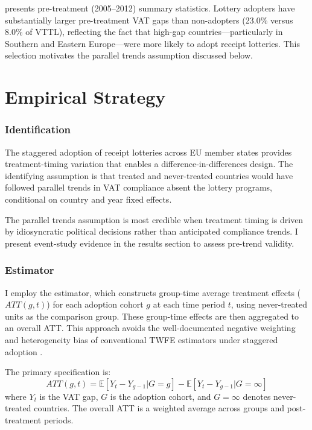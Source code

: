 \documentclass[12pt]{article}
\newcommand{\E}{\mathbb{E}}
\begin{document}


 presents pre-treatment (2005--2012) summary statistics. Lottery adopters have substantially larger pre-treatment VAT gaps than non-adopters (23.0\% versus 8.0\% of VTTL), reflecting the fact that high-gap countries---particularly in Southern and Eastern Europe---were more likely to adopt receipt lotteries. This selection motivates the parallel trends assumption discussed below.

\section{Empirical Strategy}
\label{sec:strategy}

\subsubsection*{Identification} The staggered adoption of receipt lotteries across EU member states provides treatment-timing variation that enables a difference-in-differences design. The identifying assumption is that treated and never-treated countries would have followed parallel trends in VAT compliance absent the lottery programs, conditional on country and year fixed effects.

The parallel trends assumption is most credible when treatment timing is driven by idiosyncratic political decisions rather than anticipated compliance trends. I present event-study evidence in the results section to assess pre-trend validity.

\subsubsection*{Estimator} I employ the \citet{callaway2021} estimator, which constructs group-time average treatment effects ($ATT(g,t)$) for each adoption cohort $g$ at each time period $t$, using never-treated units as the comparison group. These group-time effects are then aggregated to an overall ATT. This approach avoids the well-documented negative weighting and heterogeneity bias of conventional TWFE estimators under staggered adoption \citep{goodman2021, sun2021, dechaisemartin2020, borusyak2024}.

The primary specification is:
\begin{equation}
ATT(g,t) = \E[Y_t - Y_{g-1} | G = g] - \E[Y_t - Y_{g-1} | G = \infty]
\end{equation}
where $Y_t$ is the VAT gap, $G$ is the adoption cohort, and $G = \infty$ denotes never-treated countries. The overall ATT is a weighted average across groups and post-treatment periods.
\end{document}

